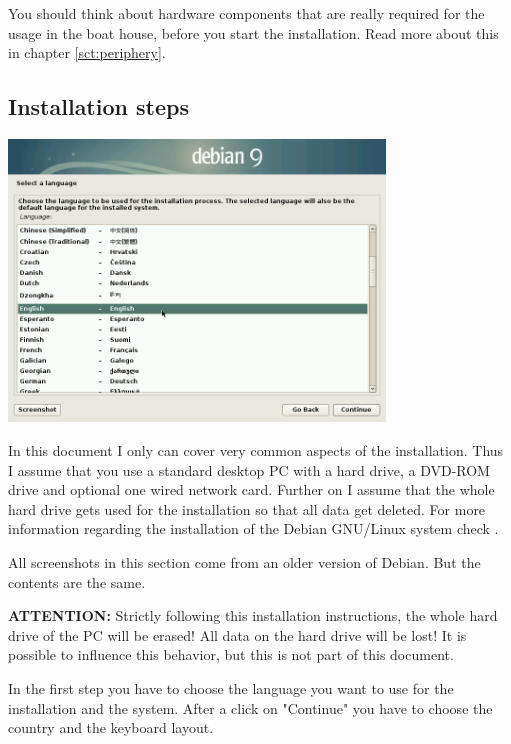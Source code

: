 \documentclass[a4paper,12pt,twoside]{article}
\begin{document}
You should think about hardware components that are really required for
the usage in the boat house, before you start the installation. Read
more about this in chapter \ref{sct:periphery}.


\subsection{Installation steps}
\label{sct:inst_steps}

\begin{minipage}{\linewidth}
    \centering
    \captionsetup{type=figure}
    \includegraphics[width=10cm]{screenshots/select_language.png}
    \label{fig:inst_language}
\end{minipage}
\bigskip

In this document I only can cover very common aspects of the
installation. Thus I assume that you use a standard desktop PC with a
hard drive, a DVD-ROM drive and optional one wired network card. Further
on I assume that the whole hard drive gets used for the installation so
that all data get deleted. For more information regarding the
installation of the Debian GNU/Linux system check \cite{DEB2}.

All screenshots in this section come from an older version of Debian. But
the contents are the same.

\textbf{ATTENTION:} Strictly following this installation instructions, the whole
hard drive of the PC will be erased! All data on the hard drive will be
lost! It is possible to influence this behavior, but this is not part
of this document.

In the first step you have to choose the language you want to use for
the installation and the system. After a click on
"Continue" you have to choose the country
and the keyboard layout.
\end{document}
